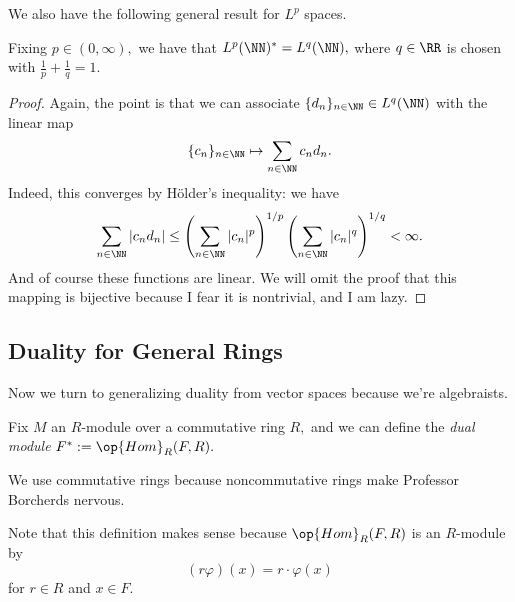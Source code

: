 We also have the following general result for $L^p$ spaces.
\begin{exercise}
	Fixing $p\in(0,\infty),$ we have that $L^p(\NN)^*=L^q(\NN),$ where $q\in\RR$ is chosen with $\frac1p+\frac1q=1.$
\end{exercise}
\begin{proof}
	Again, the point is that we can associate $\{d_n\}_{n\in\NN}\in L^q(\NN)$ with the linear map
	\[\{c_n\}_{n\in\NN}\mapsto\sum_{n\in\NN}c_nd_n.\]
	Indeed, this converges by H\"older's inequality: we have
	\[\sum_{n\in\NN}|c_nd_n|\le\left(\sum_{n\in\NN}|c_n|^p\right)^{1/p}\left(\sum_{n\in\NN}|c_n|^q\right)^{1/q}<\infty.\]
	And of course these functions are linear. We will omit the proof that this mapping is bijective because I fear it is nontrivial, and I am lazy.
\end{proof}

\subsection{Duality for General Rings}
Now we turn to generalizing duality from vector spaces because we're algebraists.
\begin{definition}
	Fix $M$ an $R$-module over a commutative ring $R,$ and we can define the \textit{dual module} $F^*:=\op{Hom}_R(F,R).$
\end{definition}
\begin{remark}
	We use commutative rings because noncommutative rings make Professor Borcherds nervous.
\end{remark}
Note that this definition makes sense because $\op{Hom}_R(F,R)$ is an $R$-module by
\[(r\varphi)(x)=r\cdot\varphi(x)\]
for $r\in R$ and $x\in F.$

